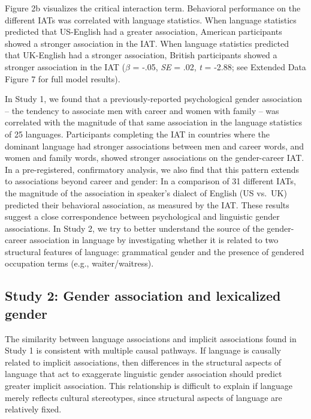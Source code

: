 \documentclass[11pt]{wlscirep}
\begin{document}
Figure 2b visualizes the critical interaction term. Behavioral performance on the different IATs was correlated with language statistics. When language statistics predicted that US-English had a greater association, American participants showed a stronger association in the IAT. When language statistics predicted that UK-English had a stronger association, British participants showed a stronger association in the IAT (\(\beta\) = -.05, \emph{SE} = .02, \emph{t} = -2.88; see Extended Data Figure 7 for full model results).

In Study 1, we found that a previously-reported psychological gender association – the tendency to associate men with career and women with family – was correlated with the magnitude of that same association in the language statistics of 25 languages. Participants completing the IAT in countries where the dominant language had stronger associations between men and career words, and women and family words, showed stronger associations on the gender-career IAT. In a pre-registered, confirmatory analysis, we also find that this pattern extends to associations beyond career and gender: In a comparison of 31 different IATs, the magnitude of the association in speaker’s dialect of English (US vs.\ UK) predicted their behavioral association, as measured by the IAT. These results suggest a close correspondence between psychological and linguistic gender associations. In Study 2, we try to
better understand the source of the gender-career association in language by investigating whether it is related to two structural features of
language: grammatical gender and the presence of gendered occupation
terms (e.g., waiter/waitress).


\subsection*{Study 2: Gender association and lexicalized
gender}\label{study-2-gender-bias-and-lexicalized-gender}

The similarity between language associations and implicit associations found in Study 1 is consistent with multiple causal pathways. If language is causally related to implicit associations, then differences in the structural aspects of language that act to exaggerate linguistic gender association should predict greater implicit association. This relationship is difficult to explain if language merely reflects cultural stereotypes, since structural aspects of language are relatively fixed.
\end{document}
